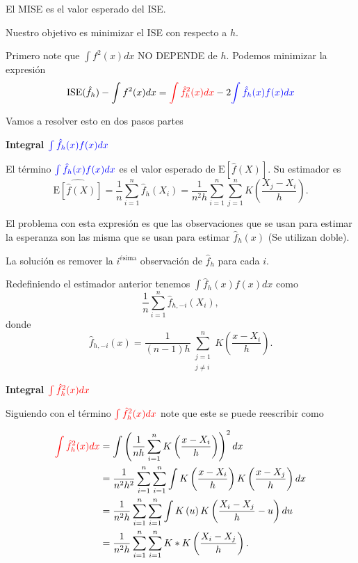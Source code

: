 \documentclass[
  12pt,
]{book}
\theoremstyle{definition}
\theoremstyle{definition}
\theoremstyle{definition}
\theoremstyle{remark}
\let\BeginKnitrBlock\begin \let\EndKnitrBlock\end
\begin{document}
\BeginKnitrBlock{remark}
{}El MISE es el valor esperado del ISE.
\EndKnitrBlock{remark}

Nuestro objetivo es minimizar el ISE con respecto a \(h\).

Primero note que \(\int f^{2}(x)dx\) NO DEPENDE de \(h\). Podemos minimizar la expresión
\begin{equation*}
\mathrm{ISE}(\hat{f}_{h})-\int f^{2}(x)dx=
\textcolor{red}{\int\hat{f}_{h}^{2}(x)dx}
-2
\textcolor{blue}{\int\hat{f}_{h}(x)f(x)dx}
\end{equation*}

Vamos a resolver esto en dos pasos partes

\textbf{Integral \(\textcolor{blue}{\int\hat{f}_{h}(x)f(x)dx}\)}

El término \(\textcolor{blue}{\int\hat{f}_{h}(x)f(x)dx}\) es el valor esperado de
\(\mathrm{E}\left[\hat{f}(X)\right]\). Su estimador es
\begin{equation*}
\widehat{\mathrm{E}\left[\hat{f}(X)\right]}
= \frac{1}{n}\sum_{i=1}^{n}\hat{f}_{h}(X_{i})
=\frac{1}{n^{2}h}\sum_{i=1}^{n}\sum_{j=1}^{n}
K\left(\frac{X_{j}-X_{i}}{h}\right).
\end{equation*}

\BeginKnitrBlock{remark}
{}El problema con esta expresión es que las observaciones que se usan para estimar la esperanza son las misma que se usan para estimar \(\hat{f}_{h}(x)\) (Se utilizan doble).
\EndKnitrBlock{remark}

La solución es remover la \(i^{\text{ésima}}\) observación de \(\hat{f}_{h}\) para cada \(i\).

Redefiniendo el estimador anterior tenemos \(\int \hat{f}_{h}(x)f(x)dx\) como
\[
\frac{1}{n}\sum_{i=1}^{n}\hat{f}_{h,-i}(X_{i}),
\]
donde
\[
\hat{f}_{h,-i}(x)=\frac{1}{(n-1)h}\sum_{\substack{j=1\\ j\neq i}}^{n}K\left( \frac{x-X_{i}}{h} \right) .
\]

\textbf{Integral \(\textcolor{red}{\int\hat{f}_{h}^{2}(x)dx}\)}

Siguiendo con el término \(\textcolor{red}{\int\hat{f}_{h}^{2}(x)dx}\) note que este se puede reescribir como

\begin{align*}
\textcolor{red}{\int\hat{f}_{h}^{2}(x)dx}
& =\int\left(\frac{1}{nh}\sum_{i=1}^{n}K\left( \frac{x-X_{i}}{h} \right)\right)^{2}dx                                    \\
& =\frac{1}{n^{2}h^{2}}\sum_{i=1}^{n}\sum_{i=1}^{n}\int K\left(\frac{x-X_{i}}{h}\right)K\left(\frac{x-X_{j}}{h}\right)dx \\
& =\frac{1}{n^{2}h}\sum_{i=1}^{n}\sum_{i=1}^{n}\int K\left(u\right)K\left(\frac{X_{i}-X_{j}}{h}-u\right)du               \\
& =\frac{1}{n^{2}h}\sum_{i=1}^{n}\sum_{i=1}^{n}K*K\left(\frac{X_{i}-X_{j}}{h}\right).
\end{align*}
\end{document}
